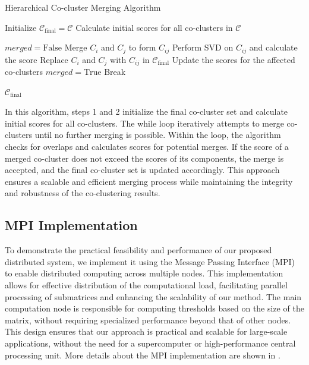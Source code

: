 \documentclass[journal]{IEEEtran}
\begin{document}
\begin{algorithm}[!t]
  \caption{Hierarchical Co-cluster Merging Algorithm}\label{alg:hierarchical_merging}
  \begin{algorithmic}[1]

    \STATE Initialize $\mathcal{C}_{\text{final}} = \mathcal{C}$
    \STATE Calculate initial scores for all co-clusters in $\mathcal{C}$

    \STATE $merged = \text{False}$
    \STATE Merge $C_i$ and $C_j$ to form $C_{ij}$
    \STATE Perform SVD on $C_{ij}$ and calculate the score
    \STATE Replace $C_i$ and $C_j$ with $C_{ij}$ in $\mathcal{C}_{\text{final}}$
    \STATE Update the scores for the affected co-clusters
    \STATE $merged = \text{True}$
    \ENDIF
    \ENDIF
    \ENDFOR
    \STATE Break
    \ENDIF
    \ENDWHILE

    \RETURN $\mathcal{C}_{\text{final}}$
  \end{algorithmic}
\end{algorithm}

In this algorithm, steps 1 and 2 initialize the final co-cluster set and calculate initial scores for all co-clusters. The while loop iteratively attempts to merge co-clusters until no further merging is possible. Within the loop, the algorithm checks for overlaps and calculates scores for potential merges. If the score of a merged co-cluster does not exceed the scores of its components, the merge is accepted, and the final co-cluster set is updated accordingly. This approach ensures a scalable and efficient merging process while maintaining the integrity and robustness of the co-clustering results.

\subsection{MPI Implementation}

To demonstrate the practical feasibility and performance of our proposed distributed system, we implement it using the Message Passing Interface (MPI) to enable distributed computing across multiple nodes. This implementation allows for effective distribution of the computational load, facilitating parallel processing of submatrices and enhancing the scalability of our method. The main computation node is responsible for computing thresholds based on the size of the matrix, without requiring specialized performance beyond that of other nodes. This design ensures that our approach is practical and scalable for large-scale applications, without the need for a supercomputer or high-performance central processing unit.
More details about the MPI implementation are shown in .
\end{document}
